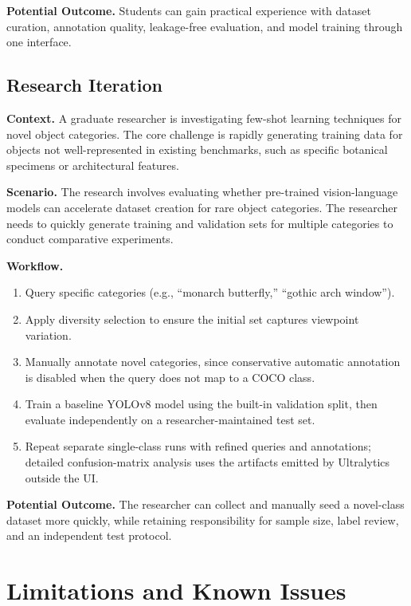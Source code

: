 \documentclass[12pt, letterpaper]{article}
\begin{document}
\textbf{Potential Outcome.} Students can gain practical experience with dataset curation,
annotation quality, leakage-free evaluation, and model training through one interface.

\subsection{Research Iteration}

\textbf{Context.} A graduate researcher is investigating few-shot learning techniques for
novel object categories. The core challenge is rapidly generating training data for objects
not well-represented in existing benchmarks, such as specific botanical specimens or
architectural features.

\textbf{Scenario.} The research involves evaluating whether pre-trained vision-language
models can accelerate dataset creation for rare object categories. The researcher needs
to quickly generate training and validation sets for multiple categories to conduct
comparative experiments.

\textbf{Workflow.}
\begin{enumerate}
  \item Query specific categories (e.g., ``monarch butterfly,'' ``gothic arch window'').
  \item Apply diversity selection to ensure the initial set captures viewpoint variation.
  \item Manually annotate novel categories, since conservative automatic annotation is
    disabled when the query does not map to a COCO class.
  \item Train a baseline YOLOv8 model using the built-in validation split, then evaluate
    independently on a researcher-maintained test set.
  \item Repeat separate single-class runs with refined queries and annotations; detailed
    confusion-matrix analysis uses the artifacts emitted by Ultralytics outside the UI.
\end{enumerate}

\textbf{Potential Outcome.} The researcher can collect and manually seed a novel-class
dataset more quickly, while retaining responsibility for sample size, label review, and an
independent test protocol.

\section{Limitations and Known Issues}
\end{document}
